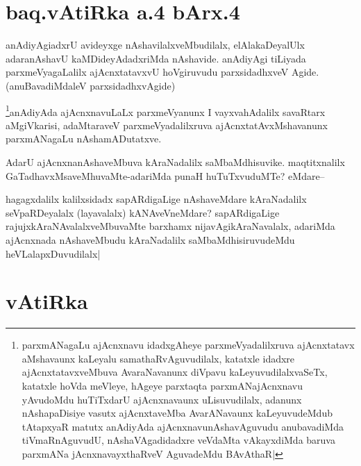 \section*{baq.vAtiRka a.4 bArx.4}


\begin{artha}
anAdiyAgiadxrU avideyxge nAshavilalxveMbudilalx, elAlakaDeyalUlx adaranAshavU kaMDideyAdadxriMda nAshavide. anAdiyAgi tiLiyada parxmeVyagaLalilx ajAcnxtatavxvU hoVgiruvudu parxsidadhxveV Agide.(anuBavadiMdaleV parxsidadhxvAgide)
\end{artha}


\begin{artha}
\footnote{parxmANagaLu ajAcnxnavu idadxgAheye parxmeVyadalilxruva ajAcnxtatavx aMshavaunx kaLeyalu samathaRvAguvudilalx, katatxle idadxre ajAcnxtatavxveMbuva AvaraNavanunx diVpavu kaLeyuvudilalxvaSeTx, katatxle hoVda meVleye, hAgeye parxtaqta parxmANajAcnxnavu yAvudoMdu huTiTxdarU ajAcnxnavaunx uLisuvudilalx, adanunx nAshapaDisiye vasutx ajAcnxtaveMba AvarANavaunx kaLeyuvudeMdub tAtapxyaR matutx anAdiyAda ajAcnxnavunAshavAguvudu anubavadiMda tiVmaRnAguvudU, nAshaVAgadidadxre veVdaMta vAkayxdiMda baruva parxmANa jAcnxnavayxthaRveV AguvadeMdu BAvAthaR|}anAdiyAda ajAcnxnavuLaLx parxmeVyanunx I vayxvahAdalilx  savaRtarx aMgiVkarisi, adaMtaraveV parxmeVyadalilxruva ajAcnxtatAvxMshavanunx parxmANagaLu nAshamADutatxve.
\end{artha}

\begin{artha}
AdarU ajAcnxnanAshaveMbuva kAraNadalilx saMbaMdhisuvike. maqtitxnalilx GaTadhavxMsaveMhuvaMte-adariMda punaH huTuTxvuduMTe? eMdare--
\end{artha}

\begin{artha}
hagagxdalilx kalilxsidadx sapARdigaLige nAshaveMdare kAraNadalilx seVpaRDeyalalx (layavalalx) kANAveVneMdare? sapARdigaLige rajujxkAraNAvalalxveMbuvaMte barxhamx nijavAgikAraNavalalx, adariMda ajAcnxnada nAshaveMbudu kAraNadalilx saMbaMdhisiruvudeMdu heVLalapxDuvudilalx|
\end{artha}

\section*{vAtiRka}

